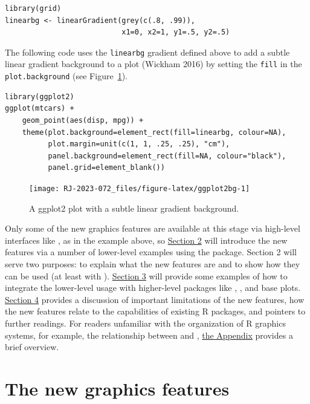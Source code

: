 \begin{verbatim}
library(grid)
linearbg <- linearGradient(grey(c(.8, .99)), 
                           x1=0, x2=1, y1=.5, y2=.5)
\end{verbatim}

The following code uses the \texttt{linearbg} gradient defined above to
add a subtle linear gradient background to a  plot
(Wickham 2016) by setting
the \texttt{fill} in the \texttt{plot.background}
(see Figure~\ref{fig:ggplot2bg}).

\begin{verbatim}
library(ggplot2)
ggplot(mtcars) +
    geom_point(aes(disp, mpg)) +
    theme(plot.background=element_rect(fill=linearbg, colour=NA),
          plot.margin=unit(c(1, 1, .25, .25), "cm"),
          panel.background=element_rect(fill=NA, colour="black"),
          panel.grid=element_blank())
\end{verbatim}

\begin{figure}[h]
\texttt{[image: RJ-2023-072\_files/figure-latex/ggplot2bg-1]} \caption{A ggplot2 plot with a subtle linear gradient background.}\label{fig:ggplot2bg}
\end{figure}

Only some of the new graphics features are available at this stage
via high-level interfaces
like , as in the example above, so \protect\hyperlink{new-features}{Section 2}
will introduce the new features via a number of lower-level
examples using the  package.
Section 2 will serve two purposes: to explain what the new features
are and to show how they can be used (at least with ).
\protect\hyperlink{integration}{Section 3} will provide some examples of how to
integrate the lower-level  usage with higher-level packages
like , , and base  plots.
\protect\hyperlink{discussion}{Section 4} provides a discussion of important limitations
of the new features, how the new features relate to the capabilities
of existing R packages, and pointers to further readings.
For readers unfamiliar with the organization of R graphics systems,
for example, the relationship between  and ,
\protect\hyperlink{rgraphics}{the Appendix} provides a brief overview.

\hypertarget{new-features}{%
\section{The new graphics features}\label{new-features}}

